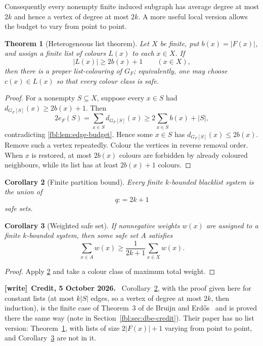 \documentclass[11pt]{article}
\newtheorem{theorem}{Theorem}[section]
\newtheorem{corollary}[theorem]{Corollary}
\theoremstyle{definition}
\theoremstyle{remark}
\newcommand{\vcent}{\mathbin{:}}
\newcommand{\defeq}{\vcent=}
\newenvironment{writenote}[1][]{\par\smallskip\begingroup\small
 \noindent\textbf{[write]}\if\relax\detokenize{#1}\relax\else~\textbf{#1.}\fi\ }%
 {\par\endgroup\smallskip}
\begin{document}
Consequently every nonempty finite induced subgraph has average degree at
most $2k$ and hence a vertex of degree at most $2k$.  A more useful local
version allows the budget to vary from point to point.

\begin{theorem}[Heterogeneous list theorem]\label{fbl:thm:list}
Let $X$ be finite, put $b(x)=\lvert F(x)\rvert$, and assign a finite list of
colours $L(x)$ to each $x\in X$.  If
\begin{equation}\label{fbl:eq:local-list}
          \lvert L(x)\rvert\ge 2b(x)+1
          \qquad(x\in X),
\end{equation}
then there is a proper list-colouring of $G_F$; equivalently, one may choose
$c(x)\in L(x)$ so that every colour class is safe.
\end{theorem}

\begin{proof}
For a nonempty $S\subseteq X$, suppose every $x\in S$ had
$d_{G_F[S]}(x)\ge 2b(x)+1$.  Then
\[
  2e_F(S)=\sum_{x\in S}d_{G_F[S]}(x)
  \ge 2\sum_{x\in S}b(x)+\lvert S\rvert,
\]
contradicting \cref{fbl:lem:edge-budget}.  Hence some $x\in S$ has
$d_{G_F[S]}(x)\le 2b(x)$.  Remove such a vertex repeatedly.  Colour the
vertices in reverse removal order.  When $x$ is restored, at most $2b(x)$
colours are forbidden by already coloured neighbours, while its list has at
least $2b(x)+1$ colours.
\end{proof}

\begin{corollary}[Finite partition bound]\label{fbl:cor:qcolor}
Every finite $k$-bounded blacklist system is the union of
\[
              q\defeq 2k+1
\]
safe sets.
\end{corollary}

\begin{corollary}[Weighted safe set]\label{fbl:cor:weighted}
If nonnegative weights $w(x)$ are assigned to a finite $k$-bounded system,
then some safe set $A$ satisfies
\[
       \sum_{x\in A}w(x)
       \ge \frac{1}{2k+1}\sum_{x\in X}w(x).
\]
\end{corollary}

\begin{proof}
Apply \cref{fbl:cor:qcolor} and take a colour class of maximum total weight.
\end{proof}

\begin{writenote}[Credit, 5 October 2026]
Corollary~\ref{fbl:cor:qcolor}, with the proof given here for constant
lists (at most $k\lvert S\rvert$ edges, so a vertex of degree at most $2k$,
then induction), is the finite case of Theorem~3 of de Bruijn and
Erd\H{o}s~\cite{deBruijnErdos} and is proved there the same way (note in
Section~\ref{fbl:sec:dbe-credit}). Their paper has no list
version: Theorem~\ref{fbl:thm:list}, with lists of size $2\lvert
F(x)\rvert+1$ varying from point to point, and
Corollary~\ref{fbl:cor:weighted} are not in it.
\end{writenote}
\end{document}

